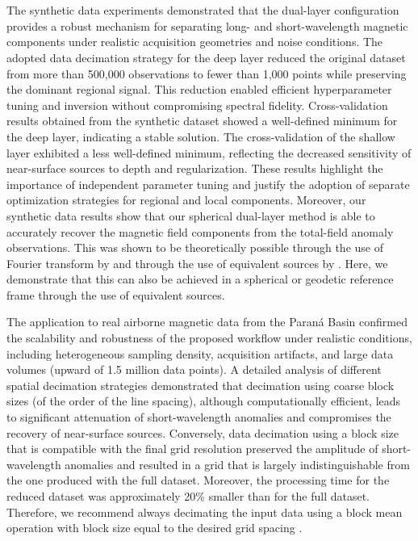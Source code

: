 \documentclass[onecolumn,10pt,a4paper]{article}
\providecommand{\DIFaddtex}[1]{{\protect\color{blue}\uwave{#1}}} %
\providecommand{\DIFaddend}{} %
\providecommand{\DIFadd}[1]{\texorpdfstring{\DIFaddtex{#1}}{#1}} %
\DeclareRobustCommand{\DIFaddend}{\DIFOaddend \let\includegraphics\DIFOincludegraphics} %
\begin{document}
\section{\DIFadd{Discussion}}

\DIFaddend The synthetic data experiments demonstrated that the dual-layer configuration
provides a robust mechanism for separating long- and short-wavelength
magnetic components under realistic acquisition geometries and noise
conditions. The adopted data decimation strategy for the deep layer reduced
the original dataset from more than 500,000 observations to fewer than 1,000
points while preserving the dominant regional signal. This reduction enabled
efficient hyperparameter tuning and inversion without compromising spectral
fidelity.
Cross-validation results obtained from the synthetic dataset showed a
well-defined minimum for the deep layer, indicating a stable solution.
The cross-validation of the shallow layer exhibited a less well-defined
minimum, reflecting the decreased sensitivity of near-surface sources to
depth and regularization. These results highlight the importance of
independent parameter tuning and justify the adoption of separate
optimization strategies for regional and local components.
Moreover, our synthetic data results show that our spherical dual-layer
method is able to accurately recover the magnetic field components from the
total-field anomaly observations. This was shown to be theoretically possible
through the use of Fourier transform by \citet{Lima2009} and through the use
of equivalent sources by \citet{Li2020}. Here, we demonstrate that this can
also be achieved in a spherical or geodetic reference frame through the use
of equivalent sources.

The application to real airborne magnetic data from the Paraná Basin confirmed
the scalability and robustness of the proposed workflow under realistic
conditions, including heterogeneous sampling density, acquisition artifacts,
and large data volumes (upward of 1.5 million data points). A detailed
analysis of different spatial decimation strategies demonstrated that
decimation using coarse block sizes (of the order of the line spacing),
although computationally efficient, leads to significant attenuation of
short-wavelength anomalies and compromises the recovery of near-surface
sources. Conversely, data decimation using a block size that is compatible
with the final grid resolution preserved the amplitude of short-wavelength
anomalies and resulted in a grid that is largely indistinguishable from the
one produced with the full dataset. Moreover, the processing time for the
reduced dataset was approximately 20\% smaller than for the full dataset.
Therefore, we recommend always decimating the input data using a block mean
operation with block size equal to the desired grid spacing \citep{Smith1990}.
\end{document}
